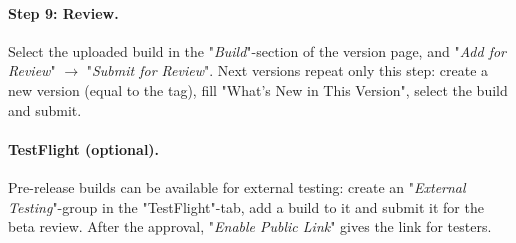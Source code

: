 \paragraph{Step 9: Review.} Select the uploaded build in the "\emph{Build}"-section of the version page, and "\emph{Add
for Review}" $\rightarrow$ "\emph{Submit for Review}". Next versions repeat only this step: create a new version (equal
to the tag), fill "What's New in This Version", select the build and submit.

\paragraph{TestFlight (optional).} Pre-release builds can be available for external testing: create an "\emph{External
Testing}"-group in the "TestFlight"-tab, add a build to it and submit it for the beta review. After the approval,
"\emph{Enable Public Link}" gives the link for testers.
